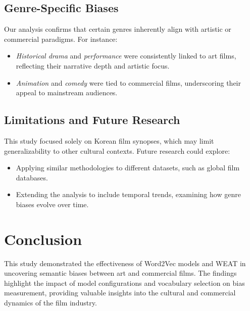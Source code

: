 \documentclass[conference]{IEEEtran}
\begin{document}
\subsection{Genre-Specific Biases}
Our analysis confirms that certain genres inherently align with artistic or commercial paradigms. For instance:
\begin{itemize}
    \item \textit{Historical drama} and \textit{performance} were consistently linked to art films, reflecting their narrative depth and artistic focus.
    \item \textit{Animation} and \textit{comedy} were tied to commercial films, underscoring their appeal to mainstream audiences.
\end{itemize}

\subsection{Limitations and Future Research}
This study focused solely on Korean film synopses, which may limit generalizability to other cultural contexts. Future research could explore:
\begin{itemize}
    \item Applying similar methodologies to different datasets, such as global film databases.
    \item Extending the analysis to include temporal trends, examining how genre biases evolve over time.
\end{itemize}

\section{Conclusion}
This study demonstrated the effectiveness of Word2Vec models and WEAT in uncovering semantic biases between art and commercial films. The findings highlight the impact of model configurations and vocabulary selection on bias measurement, providing valuable insights into the cultural and commercial dynamics of the film industry.
\end{document}
